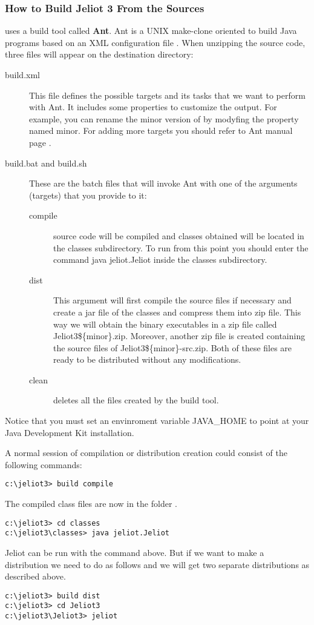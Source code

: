 \subsubsection{How to Build Jeliot 3 From the Sources}

\jel{} uses a build tool called {\bf Ant}.
Ant is a UNIX make-clone oriented to build Java
programs based on an XML configuration file \citep{Ant}.
When unzipping the source code, three files will appear on the
destination directory:
\begin{description}
\item[build.xml] This file defines the possible targets and its tasks
that we want to perform with Ant. It includes some properties
to customize the output. For example, you can rename the minor
version of \jel{} by modyfing the property named minor. For adding
more targets you should refer to Ant manual page
\citep{AntManual}.
\item[build.bat and build.sh] These are the batch files that
will invoke Ant with one of the arguments (targets) that you
provide to it:
\begin{description}
\item[compile] \jel{} source code will be compiled and classes obtained
will be located in the classes subdirectory. To run \jel{} from this
point you should enter the command java jeliot.Jeliot inside
the classes subdirectory.
\item[dist] This argument will first compile the source files if
necessary and create a jar file of the classes and compress them
into zip file. This way we will obtain the binary executables
in a zip file called {Jeliot3\$\{minor\}.zip}. Moreover, another
zip file is created containing the source files of \jel{}
{Jeliot3\$\{minor\}-src.zip}. Both of these files are ready to be
distributed without any modifications.
\item[clean] deletes all the files created by the build tool.
\end{description}
\end{description}

Notice that you must set an envinroment variable {JAVA\_HOME}
to point at your Java Development Kit installation.

A normal session of compilation or distribution creation
could consist of the following commands:

\begin{verbatim}
c:\jeliot3> build compile
\end{verbatim}
The compiled class files are now in the folder .
\begin{verbatim}
c:\jeliot3> cd classes
c:\jeliot3\classes> java jeliot.Jeliot
\end{verbatim}
Jeliot can be run with the command above. But if we want to make a
distribution we need to do as follows and we will get two separate
distributions as described above.
\begin{verbatim}
c:\jeliot3> build dist
c:\jeliot3> cd Jeliot3
c:\jeliot3\Jeliot3> jeliot
\end{verbatim}
